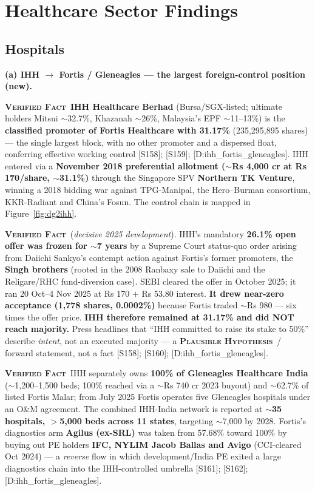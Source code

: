 \documentclass[11pt,a4paper]{article}
\newcommand{\VF}{\textcolor{vfcol}{\textsc{\textbf{Verified Fact}}}}
\newcommand{\PH}{\textcolor{phcol}{\textsc{\textbf{Plausible Hypothesis}}}}
\newcommand{\cs}[1]{\textnormal{[#1]}}
\begin{document}
\section{Healthcare Sector Findings}\label{sec:healthcare}
\subsection{Hospitals}\label{sec:hospitals}

\textbf{(a) IHH $\rightarrow$ Fortis / Gleneagles --- the largest foreign-control position (new).}

\VF\ \textbf{IHH Healthcare Berhad} (Bursa/SGX-listed; ultimate holders Mitsui $\sim$32.7\%, Khazanah $\sim$26\%, Malaysia's EPF $\sim$11--13\%) is the \textbf{classified promoter of Fortis Healthcare with 31.17\%} (235{,}295{,}895 shares) --- the single largest block, with no other promoter and a dispersed float, conferring effective working control \cs{S158}; \cs{S159}; \cs{D:ihh\_fortis\_gleneagles}. IHH entered via a \textbf{November 2018 preferential allotment ($\sim$Rs 4{,}000 cr at Rs 170/share, $\sim$31.1\%)} through the Singapore SPV \textbf{Northern TK Venture}, winning a 2018 bidding war against TPG-Manipal, the Hero--Burman consortium, KKR-Radiant and China's Fosun. The control chain is mapped in Figure~\ref{fig:dg2ihh}.

\VF\ (\emph{decisive 2025 development}). IHH's mandatory \textbf{26.1\% open offer was frozen for $\sim$7 years} by a Supreme Court status-quo order arising from Daiichi Sankyo's contempt action against Fortis's former promoters, the \textbf{Singh brothers} (rooted in the 2008 Ranbaxy sale to Daiichi and the Religare/RHC fund-diversion case). SEBI cleared the offer in October 2025; it ran 20 Oct--4 Nov 2025 at Rs 170 $+$ Rs 53.80 interest. \textbf{It drew near-zero acceptance (1{,}778 shares, 0.0002\%)} because Fortis traded $\sim$Rs 980 --- six times the offer price. \textbf{IHH therefore remained at 31.17\% and did NOT reach majority.} Press headlines that ``IHH committed to raise its stake to 50\%'' describe \emph{intent}, not an executed majority --- a \PH\ / forward statement, not a fact \cs{S158}; \cs{S160}; \cs{D:ihh\_fortis\_gleneagles}.

\VF\ IHH separately owns \textbf{100\% of Gleneagles Healthcare India} ($\sim$1{,}200--1{,}500 beds; 100\% reached via a $\sim$Rs 740 cr 2023 buyout) and $\sim$62.7\% of listed Fortis Malar; from July 2025 Fortis operates five Gleneagles hospitals under an O\&M agreement. The combined IHH-India network is reported at \textbf{$\sim$35 hospitals, $>$5{,}000 beds across 11 states}, targeting $\sim$7{,}000 by 2028. Fortis's diagnostics arm \textbf{Agilus (ex-SRL)} was taken from 57.68\% toward 100\% by buying out PE holders \textbf{IFC, NYLIM Jacob Ballas and Avigo} (CCI-cleared Oct 2024) --- a \emph{reverse} flow in which development/India PE exited a large diagnostics chain into the IHH-controlled umbrella \cs{S161}; \cs{S162}; \cs{D:ihh\_fortis\_gleneagles}.
\end{document}
